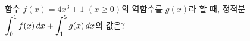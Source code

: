 함수 $f(x)=4x^3+1$ $(x\ge 0)$의 역함수를 $g(x)$라 할 때, 정적분 $\displaystyle\int_{0}^{1} f(x)\mkern3mu dx+\int_{1}^{5} g(x)\mkern3mu dx$의 값은?
